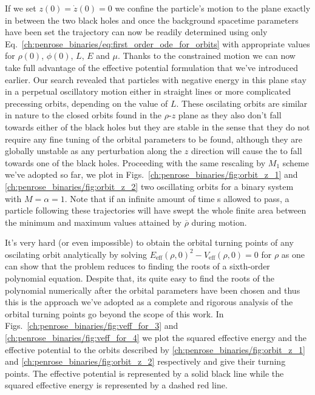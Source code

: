 If we set $z(0) = \dot{z}(0) = 0$ we confine the particle's motion to the plane exactly in between the two black holes and once the background spacetime parameters have been set the trajectory can now be readily determined using only Eq.~\eqref{ch:penrose_binaries/eq:first_order_ode_for_orbits} with appropriate values for $\rho(0)$, $\phi(0)$, $L$, $E$ and $\mu$. Thanks to the constrained motion we can now take full advantage of the effective potential formulation that we've introduced earlier. Our search revealed that particles with negative energy in this plane stay in a perpetual oscillatory motion either in straight lines or more complicated precessing orbits, depending on the value of $L$. These oscilating orbits are similar in nature to the closed orbits found in the $\rho$-$z$ plane as they also don't fall towards either of the black holes but they are stable in the sense that they do not require any fine tuning of the orbital parameters to be found, although they are globally unstable as any perturbation along the $z$ direction will cause the to fall towards one of the black holes. Proceeding with the same rescaling by $M_1$ scheme we've adopted so far, we plot in Figs.~\ref{ch:penrose_binaries/fig:orbit_z_1} and \ref{ch:penrose_binaries/fig:orbit_z_2} two oscillating orbits for a binary system with $M = \alpha = 1$. Note that if an infinite amount of time s allowed to pass, a particle following these trajectories will have swept the whole finite area between the minimum and maximum values attained by $\overline{\rho}$ during motion.

It's very hard (or even impossible) to obtain the orbital turning points of any oscilating orbit analytically by solving $E_{\text{eff}}(\rho,0)^2 - V_{\text{eff}}(\rho,0) = 0$ for $\rho$ as one can show that the problem reduces to finding the roots of a sixth-order polynomial equation. Despite that, its quite easy to find the roots of the polynomial numerically after the orbital parameters have been chosen and thus this is the approach we've adopted as a complete and rigorous analysis of the orbital turning points go beyond the scope of this work. In Figs.~\ref{ch:penrose_binaries/fig:veff_for_3} and \ref{ch:penrose_binaries/fig:veff_for_4} we plot the squared effective energy and the effective potential to the orbits described by \ref{ch:penrose_binaries/fig:orbit_z_1} and \ref{ch:penrose_binaries/fig:orbit_z_2} respectively and give their turning points. The effective potential is represented by a solid black line while the squared effective energy is represented by a dashed red line.

